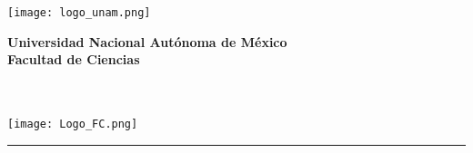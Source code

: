 
\begin{center}
    \begin{minipage}{3cm}
        \begin{center}
            \texttt{[image: logo\_unam.png]}
        \end{center}
    \end{minipage}\hfill
    \begin{minipage}{10cm}
        \begin{center}
            \textbf{\large Universidad Nacional Autónoma de México}\\[0.1cm]
            \textbf{Facultad de Ciencias}\\[0.1cm]
            \textbf{\materia}\\[0.1cm]
            \autor\\[0.1cm]
            \fecha{}
        \end{center}
    \end{minipage}\hfill
    \begin{minipage}{3cm}
        \begin{center}
            \texttt{[image: Logo\_FC.png]}
        \end{center}
    \end{minipage}
\end{center}

\noindent\rule{\textwidth}{0.01cm}\\

\begin{center}
    {\huge \tarea}
\end{center}

\vspace{0.5cm}